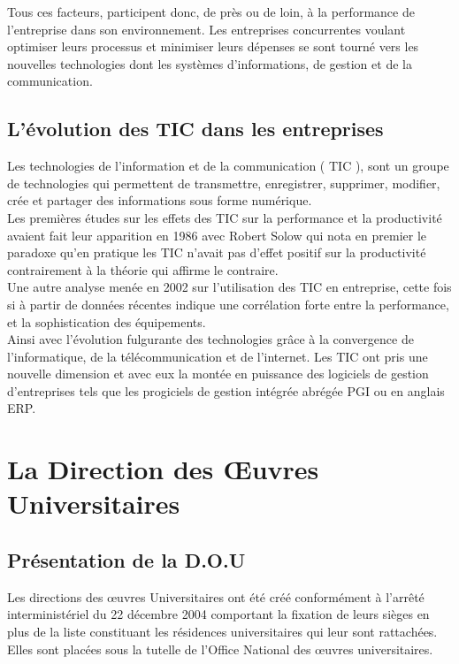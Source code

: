 Tous ces facteurs, participent donc, de près ou de loin, à la performance de l'entreprise dans son environnement\cite{perf-entreprise}. Les entreprises concurrentes voulant optimiser leurs processus et minimiser leurs dépenses se sont tourné vers les nouvelles technologies dont les systèmes d'informations, de gestion et de la communication.\\

\subsection{L’évolution des \acs{TIC} dans les entreprises}
Les technologies de l’information et de la communication ( \acs{TIC} ), sont un groupe de technologies qui permettent de transmettre, enregistrer, supprimer, modifier, crée et partager des informations sous forme numérique.\\ 

Les premières études sur les effets des \acs{TIC} sur la performance et la productivité avaient fait leur apparition en 1986 avec Robert Solow qui nota en premier le paradoxe qu’en pratique les \acs{TIC} n’avait pas d’effet positif sur la productivité contrairement à la théorie qui affirme le contraire.\\

Une autre analyse menée en 2002 sur l’utilisation des \acs{TIC} en entreprise, cette fois si à partir de données récentes indique une corrélation forte entre la performance, et la sophistication des équipements.\\

Ainsi avec l’évolution fulgurante des technologies grâce à la convergence de l’informatique, de la télécommunication et de l’internet. Les \acs{TIC} ont pris une nouvelle dimension et avec eux la montée en puissance des logiciels de gestion d’entreprises tels que les progiciels de gestion intégrée abrégée PGI ou en anglais ERP.\\

\section{La Direction des Œuvres Universitaires}
\subsection{Présentation de la \acs{D.O.U} \cite{dou}}
Les directions des œuvres Universitaires ont été créé conformément à l'arrêté interministériel du 22 décembre 2004 comportant la fixation de leurs sièges en plus de la liste constituant les résidences universitaires qui leur sont rattachées. Elles sont placées sous la tutelle de l'Office National des œuvres universitaires.\\

